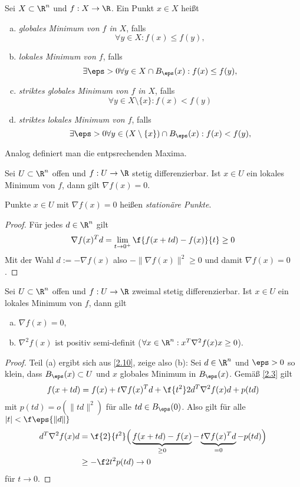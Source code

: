 \begin{df} \label{2.9}
	Sei $X \subset \R^n$ und $f: X \to \R$.
	Ein Punkt $x \in X$ heißt
	\begin{enumerate}[(a)]
		\item
			\emph{globales Minimum von $f$ in $X$}, falls
			\[
				\forall y \in X: f(x) \le f(y),
			\]
		\item
			\emph{lokales Minimum von $f$}, falls
			\[
				\exists \eps > 0 \forall y \in X \cap B_\eps(x): f(x) \le f(y),
			\]
		\item
			\emph{striktes globales Minimum von $f$ in $X$}, falls
			\[
				\forall y \in X \setminus \{x\}: f(x) < f(y)
			\]
		\item
			\emph{striktes lokales Minimum von $f$}, falls
			\[
				\exists \eps > 0 \forall y \in (X \setminus \{x\}) \cap B_\eps(x): f(x) < f(y),
			\]
	\end{enumerate}
	Analog definiert man die entpsrechenden Maxima.
\end{df}

\begin{st} \label{2.10} \label{st:optN1}
	Sei $U \subset \R^n$ offen und $f: U \to \R$ stetig differenzierbar.
	Ist $x \in U$ ein lokales Minimum von $f$, dann gilt $\nabla f(x) = 0$.

	Punkte $x \in U$ mit $\nabla f(x) = 0$ heißen \emph{stationäre Punkte}.
	\begin{proof}
		Für jedes $d \in \R^n$ gilt
		\[
			\nabla f(x)^T d
			= \lim_{t \to 0^+} \f {f(x+td) - f(x)}{t}
			\ge 0
		\]
		Mit der Wahl $d := - \nabla f(x)$ also $-\|\nabla f(x)\|^2 \ge 0$ und damit $\nabla f(x) = 0$.
	\end{proof}
\end{st}

\begin{st} \label{2.11} \label{st:optN2}
	Sei $U \subset \R^n$ offen und $f: U \to \R$ zweimal stetig differenzierbar.
	Ist $x \in U$ ein lokales Minimum von $f$, dann gilt
	\begin{enumerate}[(a)]
		\item
			$\nabla f(x) = 0$,
		\item
			$\nabla^2 f(x)$ ist positiv semi-definit ($\forall x \in \R^n : x^T \nabla^2 f(x) x \ge 0$).
	\end{enumerate}
	\begin{proof}
		Teil (a) ergibt sich aus \ref{2.10}, zeige also (b):
		Sei $d \in \R^n$ und $\eps > 0$ so klein, dass $B_\eps(x) \subset U$ und $x$ globales Minimum in $B_\eps(x)$.
		Gemäß \ref{2.3} gilt
		\[
			f(x+td)
			= f(x) + t \nabla f(x)^T d + \f {t^2}2 d^T \nabla^2 f(x) d + p(td)
		\]
		mit $p(td) = o(\|td\|^2)$ für alle $td \in B_\eps(0)$.
		Also gilt für alle $|t| < \f \eps{\|d\|}$
		\begin{align*}
			d^T \nabla^2 f(x) d
			&= \f{2}{t^2} \Big( \underbrace{f(x+td) - f(x)}_{\ge 0} - \underbrace{t\nabla f(x)^T d}_{=0} - p(td) \Big) \\
			&\ge - \f 2{t^2} p(td)
			\to 0
		\end{align*}
		für $t \to 0$.
	\end{proof}
\end{st}

